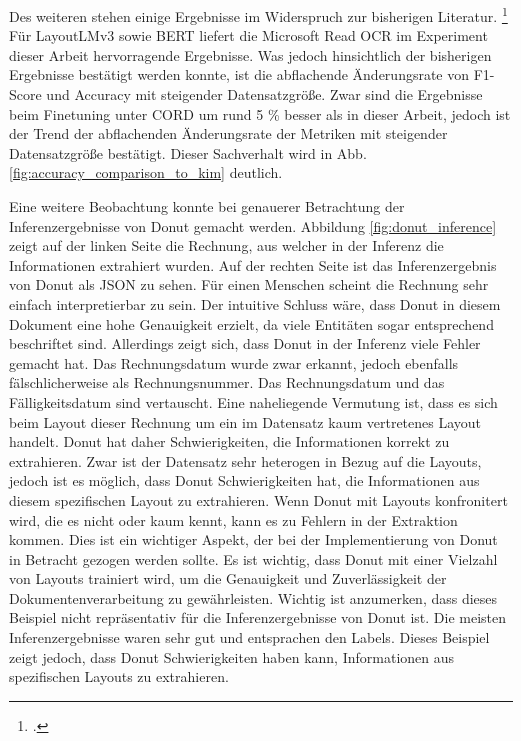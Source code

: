 Des weiteren stehen einige Ergebnisse im Widerspruch zur bisherigen Literatur. \footcites[Vgl.][S. 13]{kim_ocr-free_2021} Für LayoutLMv3 sowie BERT liefert die Microsoft Read OCR im Experiment dieser Arbeit hervorragende Ergebnisse. Was jedoch hinsichtlich der bisherigen Ergebnisse bestätigt werden konnte, ist die abflachende Änderungsrate von F1-Score und Accuracy mit steigender Datensatzgröße. Zwar sind die Ergebnisse beim Finetuning unter CORD um rund 5 \% besser als in dieser Arbeit, jedoch ist der Trend der abflachenden Änderungsrate der Metriken mit steigender Datensatzgröße bestätigt. Dieser Sachverhalt wird in Abb. \ref{fig:accuracy_comparison_to_kim} deutlich.

Eine weitere Beobachtung konnte bei genauerer Betrachtung der Inferenzergebnisse von Donut gemacht werden. Abbildung \ref{fig:donut_inference} zeigt auf der linken Seite die Rechnung, aus welcher in der Inferenz die Informationen extrahiert wurden. Auf der rechten Seite ist das Inferenzergebnis von Donut als JSON zu sehen. Für einen Menschen scheint die Rechnung sehr einfach interpretierbar zu sein. Der intuitive Schluss wäre, dass Donut in diesem Dokument eine hohe Genauigkeit erzielt, da viele Entitäten sogar entsprechend beschriftet sind. Allerdings zeigt sich, dass Donut in der Inferenz viele Fehler gemacht hat. Das Rechnungsdatum wurde zwar erkannt, jedoch ebenfalls fälschlicherweise als Rechnungsnummer. Das Rechnungsdatum und das Fälligkeitsdatum sind vertauscht. Eine naheliegende Vermutung ist, dass es sich beim Layout dieser Rechnung um ein im Datensatz kaum vertretenes Layout handelt. Donut hat daher Schwierigkeiten, die Informationen korrekt zu extrahieren. Zwar ist der Datensatz sehr heterogen in Bezug auf die Layouts, jedoch ist es möglich, dass Donut Schwierigkeiten hat, die Informationen aus diesem spezifischen Layout zu extrahieren. Wenn Donut mit Layouts konfronitert wird, die es nicht oder kaum kennt, kann es zu Fehlern in der Extraktion kommen. Dies ist ein wichtiger Aspekt, der bei der Implementierung von Donut in Betracht gezogen werden sollte. Es ist wichtig, dass Donut mit einer Vielzahl von Layouts trainiert wird, um die Genauigkeit und Zuverlässigkeit der Dokumentenverarbeitung zu gewährleisten. Wichtig ist anzumerken, dass dieses Beispiel nicht repräsentativ für die Inferenzergebnisse von Donut ist. Die meisten Inferenzergebnisse waren sehr gut und entsprachen den Labels. Dieses Beispiel zeigt jedoch, dass Donut Schwierigkeiten haben kann, Informationen aus spezifischen Layouts zu extrahieren.

